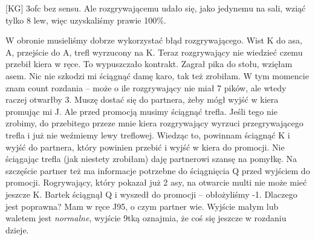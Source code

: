 \documentclass[12pt, a4paper]{article}
\begin{document}
\vspace*{-0.2cm}

[KG] 3\diams ofc bez sensu. Ale rozgrywającemu udało się,
jako jedynemu na sali, wziąć tylko 8 lew, więc uzyskaliśmy prawie 100\%.

W obronie musieliśmy dobrze wykorzystać błąd rozgrywającego.
Wist \xdiams K do asa, \xhearts A, przejście do
\xclubs A, trefl wyrzucony na \xhearts K.
Teraz rozgrywający nie wiedzieć czemu
przebił kiera w ręce. To wypuszczało kontrakt.
Zagrał pika do stołu, wzięłam asem. Nic nie szkodzi mi ściągnąć
damę karo, tak też zrobiłam. W tym momencie znam
count rozdania -- może o ile rozgrywający nie miał 7 pików,
ale wtedy raczej otwarłby 3\spades. Muszę dostać się do partnera,
żeby mógł wyjść w kiera promując mi \xspades J.
Ale przed promocją musimy ściągnąć trefla. Jeśli tego nie
zrobimy, do przebitego przeze mnie kiera rozgrywający wyrzuci 
przegrywającego trefla i już nie weźmiemy lewy treflowej.
Wiedząc to, powinnam ściągnąć \xclubs K i wyjść 
do partnera, który powinien przebić i wyjść w kiera do promocji.
Nie ściągając trefla (jak niestety zrobiłam) daję partnerowi szansę
na pomyłkę. Na szczęście partner też ma informacje potrzebne
do ściągnięcia \xclubs Q przed wyjściem do promocji.
Rogrywający, który pokazał już 2 asy, na otwarcie multi nie może
mieć jeszcze \xclubs K. Bartek ściągnął \xclubs Q i wyszedł do promocji
-- obłożyliśmy -1.
Dlaczego  jest poprawna? Mam w ręce \xdiams J95,
o czym partner wie. Wyjście małym lub waletem jest 
\textit{normalne}, wyjście 9tką oznajmia, że
coś się jeszcze w rozdaniu dzieje.
\end{document}
